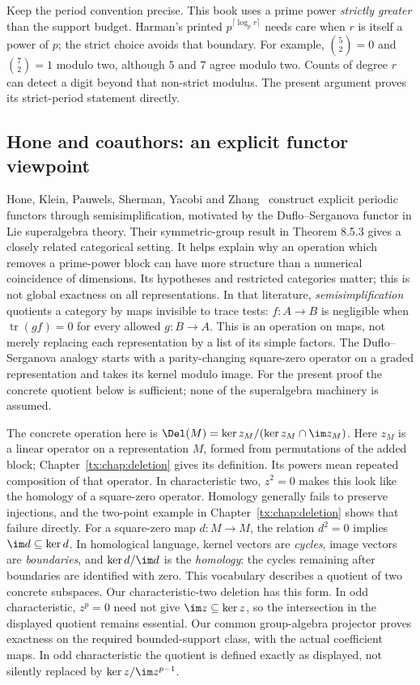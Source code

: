 \documentclass[11pt,a4paper,oneside,openany]{book}
\theoremstyle{definition}\newtheorem{definition}[theorem]{Definition}
\theoremstyle{remark}\newtheorem{remark}[theorem]{Remark}
\numberwithin{equation}{chapter}
\begin{document}
Keep the period convention precise. This book uses a prime power
\emph{strictly greater} than the support budget. Harman's printed
$p^{\lceil\log_p r\rceil}$ needs care when $r$ is itself a power of
$p$; the strict choice avoids that boundary. For example,
$\binom52=0$ and $\binom72=1$ modulo two, although $5$ and $7$ agree
modulo two. Counts of degree $r$ can detect a digit beyond that
non-strict modulus. The present argument proves its strict-period
statement directly.

\subsection{Hone and coauthors: an explicit functor viewpoint}
Hone, Klein, Pauwels, Sherman, Yacobi and Zhang~\cite{HKPSYZ}
construct explicit periodic functors through semisimplification,
motivated by the Duflo--Serganova functor in Lie superalgebra theory.
Their symmetric-group result in Theorem 8.5.3 gives a closely related
categorical setting. It helps explain why an operation which removes
a prime-power block can have more structure than a numerical
coincidence of dimensions. Its hypotheses and restricted categories
matter; this is not global exactness on all representations.
In that literature, \emph{semisimplification} quotients a category by
maps invisible to trace tests: $f:A\to B$ is negligible when
$\operatorname{tr}(gf)=0$ for every allowed $g:B\to A$.
This is an operation on maps, not merely replacing each representation
by a list of its simple factors.
The Duflo--Serganova analogy starts with a parity-changing square-zero
operator on a graded representation and takes its kernel modulo image.
For the present proof the concrete quotient below is sufficient;
none of the superalgebra machinery is assumed.

The concrete operation here is
$\Del(M)=\ker z_M/(\ker z_M\cap\im z_M)$. Here $z_M$ is a linear
operator on a representation $M$, formed from permutations of the
added block; Chapter~\ref{tx:chap:deletion} gives its definition.
Its powers mean repeated composition of that operator. In characteristic two,
$z^2=0$ makes this look like the homology of a square-zero operator.
Homology generally fails to preserve injections, and the two-point
example in Chapter~\ref{tx:chap:deletion} shows that failure directly.
For a square-zero map $d:M\to M$, the relation $d^2=0$ implies
$\im d\subseteq\ker d$. In homological language, kernel vectors are
\emph{cycles}, image vectors are \emph{boundaries}, and
$\ker d/\im d$ is the \emph{homology}: the cycles remaining after
boundaries are identified with zero.
This vocabulary describes a quotient of two concrete subspaces.
Our characteristic-two deletion has this form. In odd characteristic,
$z^p=0$ need not give $\im z\subseteq\ker z$, so the intersection
in the displayed quotient remains essential.
Our common group-algebra projector proves exactness on the required
bounded-support class, with the actual coefficient maps. In odd
characteristic the quotient is defined exactly as displayed, not
silently replaced by $\ker z/\im z^{p-1}$.
\end{document}
